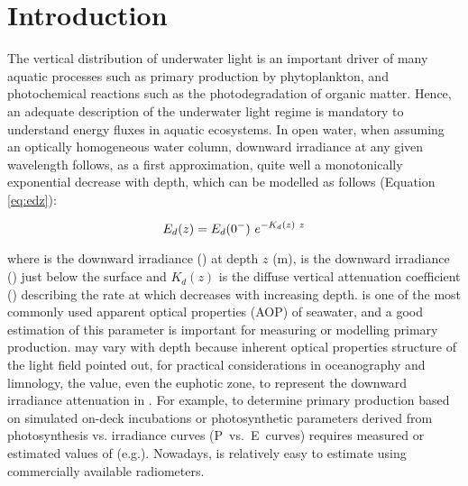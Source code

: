 \section{Introduction}

The vertical distribution of underwater light is an important driver of many aquatic processes \DIFdelbegin \DIFdel{, }\DIFdelend such as primary production by phytoplankton, and photochemical reactions \DIFdelbegin \DIFdel{, }\DIFdelend such as the photodegradation of organic matter. Hence, an adequate description of the underwater light regime is mandatory to understand energy fluxes in aquatic ecosystems. In open water, when assuming an optically homogeneous water column, downward irradiance at any given wavelength follows, as a first approximation, quite well a monotonically exponential decrease with depth, which can be modelled as follows \citep{Kirk1994} (Equation \ref{eq:edz}):

\begin{equation}
    {E_d(z)}{} = {E_d(0^-)}{}~e^{-K_{d}(z)~z}
    \label{eq:edz}
\end{equation}

\noindent where \edz{} is the downward \DIFaddbegin {}\DIFaddend irradiance (\wmsquare{}) at depth $z$ (m), \edzero{} is the downward \DIFaddbegin {}\DIFaddend irradiance (\wmsquare{}) just below the surface and $K_d(z)$ is the diffuse vertical attenuation coefficient (\mminus{}) describing the rate at which \DIFdelbegin {}\DIFdelend \DIFaddbegin {}\DIFaddend decreases with increasing depth. \ked{} is one of the most commonly used apparent optical properties (AOP) of seawater, and a good estimation of this parameter is important for measuring or modelling primary production. \ked{} may vary with depth because \DIFdelbegin {}\DIFdelend \DIFaddbegin {}\DIFaddend inherent optical properties \DIFdelbegin {}\DIFdelend \DIFaddbegin {}\DIFaddend structure of the light field\DIFdelbegin {}\DIFdelend \DIFaddbegin {}\DIFaddend \citet{Kirk1994} pointed out, for practical considerations in oceanography and limnology, the \ked{} value, even \DIFdelbegin {}\DIFdelend \DIFaddbegin {}\DIFaddend the euphotic zone, \DIFdelbegin {}\DIFdelend \DIFaddbegin {}\DIFaddend to represent the downward irradiance attenuation in \DIFdelbegin {}\DIFdelend \DIFaddbegin {}\DIFaddend . For example, to determine primary production based on simulated on-deck incubations or photosynthetic parameters derived from photosynthesis vs. irradiance curves (P~vs.~E~curves) requires measured or estimated values of \ked{} (e.g.\DIFaddbegin \DIFadd{, }\DIFaddend \citet{Morel1996}). Nowadays, \ked{} is relatively easy to estimate using commercially available radiometers.

